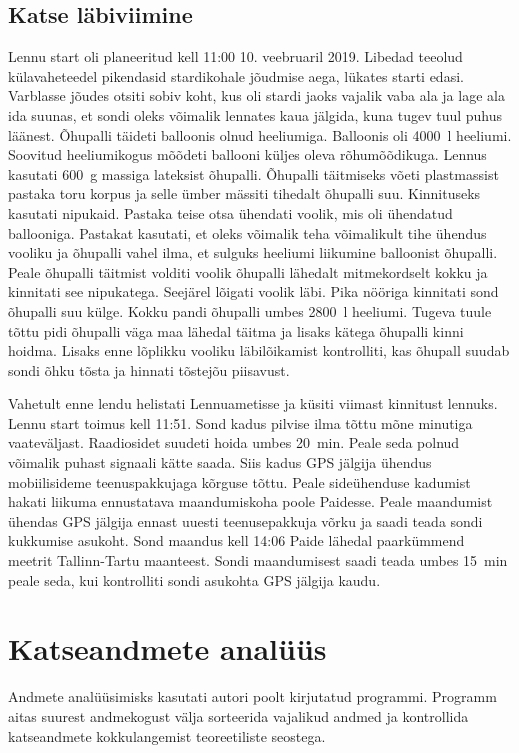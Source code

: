\documentclass{trkut}%
\begin{document}
\section{Katse läbiviimine}
Lennu start oli planeeritud kell 11:00 10. veebruaril 2019. Libedad teeolud külavaheteedel pikendasid stardikohale jõudmise aega, lükates starti edasi. Varblasse jõudes otsiti sobiv koht, kus oli stardi jaoks vajalik vaba ala ja lage ala ida suunas, et sondi oleks võimalik lennates kaua jälgida, kuna tugev tuul puhus läänest. Õhupalli täideti balloonis olnud heeliumiga. Balloonis oli \SI{4000}{l} heeliumi. Soovitud heeliumikogus mõõdeti ballooni küljes oleva rõhumõõdikuga. Lennus kasutati \SI{600}{g} massiga lateksist õhupalli. Õhupalli täitmiseks võeti plastmassist pastaka toru korpus ja selle ümber mässiti tihedalt õhupalli suu. Kinnituseks kasutati nipukaid. Pastaka teise otsa ühendati voolik, mis oli ühendatud ballooniga. Pastakat kasutati, et oleks võimalik teha võimalikult tihe ühendus vooliku ja õhupalli vahel ilma, et sulguks heeliumi liikumine balloonist õhupalli. Peale õhupalli täitmist volditi voolik õhupalli lähedalt mitmekordselt kokku ja kinnitati see nipukatega. Seejärel lõigati voolik läbi. Pika nööriga kinnitati sond õhupalli suu külge. Kokku pandi õhupalli umbes \SI{2800}{l} heeliumi. Tugeva tuule tõttu pidi õhupalli väga maa lähedal täitma ja lisaks kätega õhupalli kinni hoidma. Lisaks enne lõplikku vooliku läbilõikamist kontrolliti, kas õhupall suudab sondi õhku tõsta ja hinnati tõstejõu piisavust.

Vahetult enne lendu helistati Lennuametisse ja küsiti viimast kinnitust lennuks. Lennu start toimus kell 11:51. Sond kadus pilvise ilma tõttu mõne minutiga vaateväljast. Raadiosidet suudeti hoida umbes \SI{20}{min}. Peale seda polnud võimalik puhast signaali kätte saada. Siis kadus GPS jälgija ühendus mobiilisideme teenuspakkujaga kõrguse tõttu. Peale sideühenduse kadumist hakati liikuma ennustatava maandumiskoha poole Paidesse. Peale maandumist ühendas GPS jälgija ennast uuesti teenusepakkuja võrku ja saadi teada sondi kukkumise asukoht. Sond maandus kell 14:06 Paide lähedal paarkümmend meetrit Tallinn-Tartu maanteest. Sondi maandumisest saadi teada umbes \SI{15}{min} peale seda, kui kontrolliti sondi asukohta GPS jälgija kaudu.






\chapter{Katseandmete analüüs}
Andmete analüüsimisks kasutati autori poolt kirjutatud programmi. Programm aitas suurest andmekogust välja sorteerida vajalikud andmed ja kontrollida katseandmete kokkulangemist teoreetiliste seostega.
\end{document}
